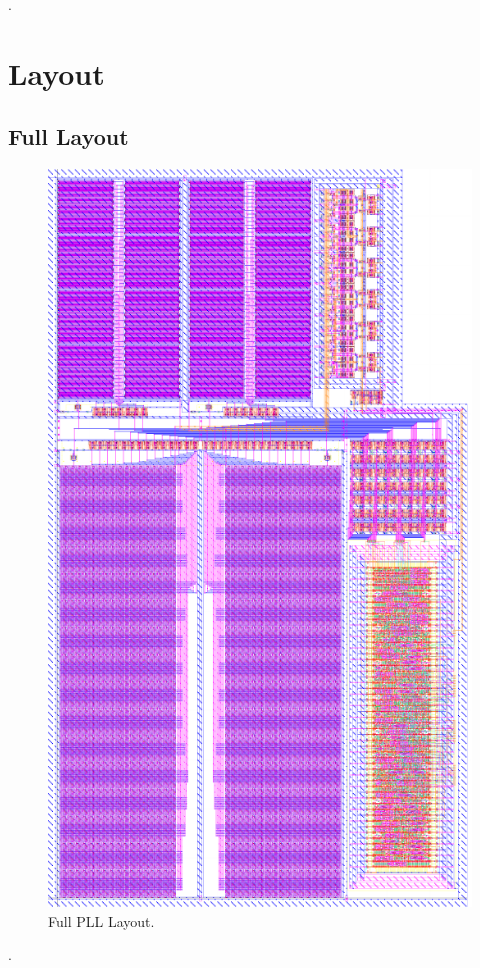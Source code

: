 {\color{white}.}
\FloatBarrier\pagebreak

	\section{Layout}
		\subsection{Full Layout}\label{sec:full_lay}
			\begin{figure}[htb!]
			        \centering
			        \includegraphics[height=0.8\textheight, angle=0]{./figs/layout/full_lay_1200dpi}
			    \caption{Full PLL Layout.}
			\end{figure}	
		{\color{white}.}
		\FloatBarrier\pagebreak	


